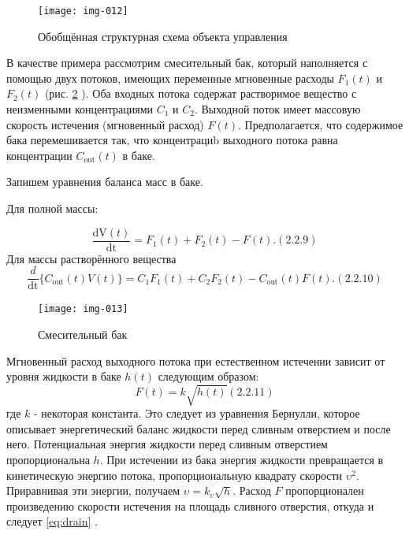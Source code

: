 \begin{figure}[h]
\centering  \texttt{[image: img-012]} 
\caption{Обобщённая структурная схема объекта управления}
\label{fig:2_4}
\end{figure}
		В качестве примера рассмотрим смесительный бак, который наполняется с помощью двух потоков, имеющих переменные
		мгновенные расходы  $F_1(t)$ и  $F_2(t)$ (рис. \ref{fig:buc}%
		). Оба входных потока содержат растворимое вещество с неизменными
		концентрациями  $C_1$ и  $C_2$. Выходной поток имеет массовую скорость истечения (мгновенный расход)  $F(t)$.
		Предполагается, что содержимое бака перемешивается так, что концентрациb выходного потока равна концентрации 
		$C_{{\text{out}}}(t)$ в баке.
		
		Запишем уравнения баланса масс в баке.
		
		Для полной массы:



\begin{equation}\label{eq:full mass}
 \frac{\text{dV}(t)}{\text{dt}}=F_{1}(t)+F_{2}(t)-F(t). (2.2.9)
\end{equation}
		Для массы растворённого вещества
\begin{equation}\label{eq:solute}
		 \frac{d}{\text{dt}}\{C_{\text{out}}(t)V(t)\}=C_1F_1(t)+C_2F_2(t)-C_{\text{out}}(t)F(t).(2.2.10)
\end{equation}

\begin{figure}[h]
	\centering
	\texttt{[image: img-013]}
	\caption{Смесительный бак}
	\label{fig:buc}
\end{figure}
\bigskip


		Мгновенный расход выходного потока при естественном истечении зависит от уровня жидкости в баке  $h(t)$ следующим
		образом:
\begin{equation}\label{eq:drain}
	F(t)=k\sqrt{h(t)}(2.2.11)
\end{equation}
		где   $k$ - некоторая константа. Это следует из уравнения Бернулли, которое описывает энергетический баланс жидкости
		перед сливным отверстием и после него. Потенциальная энергия жидкости перед сливным отверстием пропорциональна 
		$h$. При истечении из бака энергия жидкости превращается в кинетическую энергию потока, пропорциональную квадрату
		скорости  $\upsilon^2$. Приравнивая эти энергии, получаем  $\upsilon=k_{\upsilon}\sqrt h$. Расход  $F$ пропорционален произведению скорости
		истечения на площадь сливного отверстия, откуда и следует \eqref{eq:drain}%
		.



